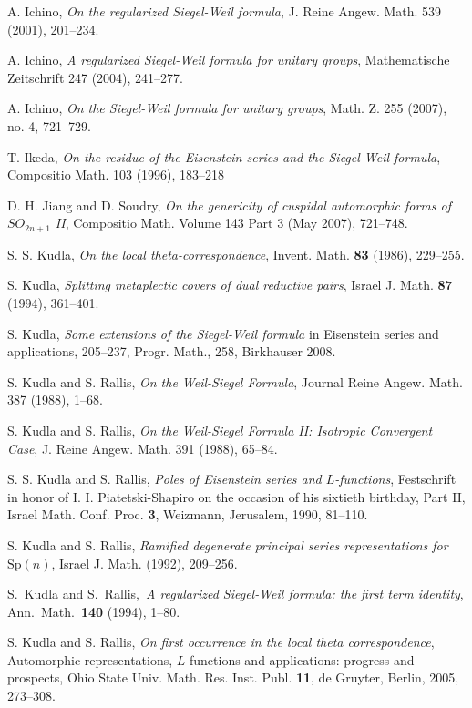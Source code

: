 \documentclass[10pt]{amsart}
\theoremstyle{plain}
\numberwithin{equation}{section}
\begin{document}
\begin{thebibliography}{99}
  A. Ichino, {\em On the regularized Siegel-Weil
     formula}, J. Reine Angew. Math. 539 (2001), 201--234.

 A. Ichino,  {\em A regularized Siegel-Weil formula
    for unitary groups}, Mathematische Zeitschrift 247 (2004),
  241--277.

 A. Ichino, {\em On the Siegel-Weil formula for
    unitary groups}, Math. Z. 255 (2007), no. 4, 721--729.

 T. Ikeda, {\em On the residue of the Eisenstein
    series and the Siegel-Weil formula}, Compositio Math. 103 (1996),
  183--218

 D. H. Jiang and D. Soudry, 
{\em On the genericity of cuspidal automorphic forms of $SO_{2n+1}$ II},
Compositio Math. Volume 143 Part 3 (May 2007), 721--748.
 
 
S. S. Kudla,
\emph{On the local theta-correspondence},
Invent. Math. \textbf{83} (1986), 229--255.

 S. Kudla,
\emph{Splitting metaplectic covers of dual reductive pairs},
Israel J. Math. \textbf{87} (1994), 361--401.

S. Kudla, {\it Some extensions of the Siegel-Weil formula} in
Eisenstein series and applications, 205--237, Progr. Math., 258,
Birkhauser 2008.

 
 S. Kudla and S. Rallis, {\em On the Weil-Siegel Formula},
Journal Reine Angew. Math. 387 (1988), 1--68.

 S. Kudla and S. Rallis, {\em On the Weil-Siegel
Formula II: Isotropic Convergent Case}, J. Reine Angew. Math. 391
(1988), 65--84.
 
S. S. Kudla and S. Rallis,
\emph{Poles of Eisenstein series and $L$-functions},
Festschrift in honor of I. I. Piatetski-Shapiro on the occasion of
 his sixtieth birthday, Part II,
Israel Math. Conf. Proc. \textbf{3}, Weizmann, Jerusalem, 1990, 81--110.
 
S. Kudla and S. Rallis,
\emph{Ramified degenerate principal series representations for $\mathrm{Sp}(n)$},
Israel J. Math.  (1992), 209--256.

S.\ Kudla and S.\ Rallis,\ {\it A regularized Siegel-Weil
formula: the first term identity}, Ann.\ Math.\ \textbf{140} (1994),
1--80.

S. Kudla and S. Rallis,
\emph{On first occurrence in the local theta correspondence},
Automorphic representations, $L$-functions and applications:
 progress and prospects,
Ohio State Univ. Math. Res. Inst. Publ. \textbf{11},
de Gruyter, Berlin, 2005, 273--308.


\end{thebibliography}
\end{document}
